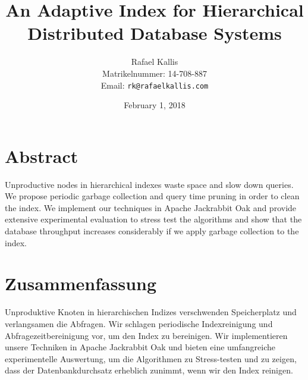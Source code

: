 \message{ !name(thesis.tex)}\documentclass[abstracton,12pt]{scrartcl}
\title{An Adaptive Index for Hierarchical Distributed Database Systems}
\author{
    Rafael Kallis\\[-5pt]
    \scriptsize Matrikelnummer: 14-708-887\\[-5pt]
    \scriptsize Email: \texttt{rk@rafaelkallis.com}
}
\date{\vspace*{2cm}February 1, 2018}
\theoremstyle{definition}
\begin{document}


\maketitle
\thispagestyle{empty}


\newpage
\thispagestyle{empty}
\vspace*{7cm}

\section*{Abstract}

Unproductive nodes in hierarchical indexes waste space and slow down queries.
We propose periodic garbage collection and query time pruning in order to
clean the index. We implement our techniques in Apache Jackrabbit Oak and
provide extensive experimental evaluation to stress test the algorithms and
show that the database throughput increases considerably if we apply garbage
collection to the index.

\newpage
\thispagestyle{empty}
\vspace*{7cm}

\section*{Zusammenfassung}

Unproduktive Knoten in hierarchischen Indizes verschwenden Speicherplatz und
verlangsamen die Abfragen. Wir schlagen periodische Indexreinigung und
Abfragezeitbereinigung vor, um den Index zu bereinigen. Wir implementieren
unsere Techniken in Apache Jackrabbit Oak und bieten eine umfangreiche
experimentelle Auswertung, um die Algorithmen zu Stress-testen und zu zeigen, dass der
Datenbankdurchsatz erheblich zunimmt, wenn wir den Index reinigen.

\newpage
\thispagestyle{empty}

\tableofcontents

\newpage
\thispagestyle{empty}

\listoffigures

\newpage

\end{document}
